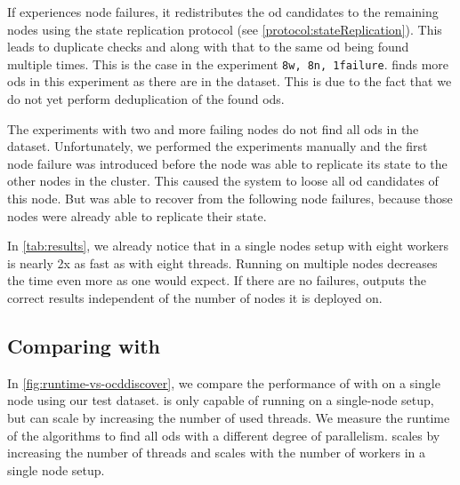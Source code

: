   If \dodo{} experiences node failures, it redistributes the \gls{od} candidates to the remaining nodes using the state replication protocol (see \cref{protocol:stateReplication}).
  This leads to duplicate checks and along with that to the same \gls{od} being found multiple times.
  This is the case in the experiment \texttt{8w, 8n, 1failure}.
  \dodo{} finds more \glspl{od} in this experiment as there are in the dataset.
  This is due to the fact that we do not yet perform deduplication of the found \glspl{od}.

  The experiments with two and more failing nodes do not find all \glspl{od} in the dataset.
  Unfortunately, we performed the experiments manually and the first node failure was introduced before the node was able to replicate its state to the other nodes in the cluster.
  This caused the system to loose all \gls{od} candidates of this node.
  But \dodo{} was able to recover from the following node failures, because those nodes were already able to replicate their state.

  In \cref{tab:results}, we already notice that \dodo{} in a single nodes setup with eight workers is nearly 2x as fast as \ocddiscover{} with eight threads.
  Running \dodo{} on multiple nodes decreases the time even more as one would expect.
  If there are no failures, \dodo{} outputs the correct results independent of the number of nodes it is deployed on.
  
\subsection{Comparing with \ocddiscover{}}\label{sec:evaluation:comparison}

  In \cref{fig:runtime-vs-ocddiscover}, we compare the performance of \dodo{} with \ocddiscover{} on a single node using our test dataset.
  \ocddiscover{} is only capable of running on a single-node setup, but can scale by increasing the number of used threads.
  We measure the runtime of the algorithms to find all \glspl{od} with a different degree of parallelism.
  \ocddiscover{} scales by increasing the number of threads and \dodo{} scales with the number of workers in a single node setup.

